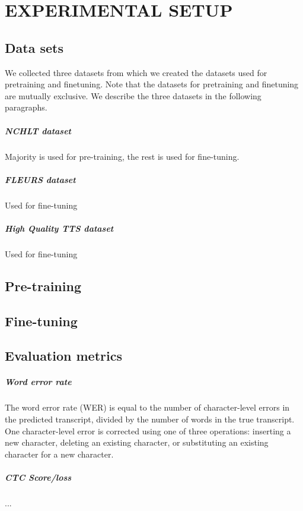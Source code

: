 \chapter{EXPERIMENTAL SETUP}

\section{Data sets}

We collected three datasets from which we created the datasets used for pretraining and finetuning. 
Note that the datasets for pretraining and finetuning are mutually exclusive. 
We describe the three datasets in the following paragraphs.

\paragraph*{NCHLT dataset} Majority is used for pre-training, the rest is used for fine-tuning.

\paragraph*{FLEURS dataset} Used for fine-tuning

\paragraph*{High Quality TTS dataset} Used for fine-tuning



\section{Pre-training}

\section{Fine-tuning}

\section{Evaluation metrics}

\paragraph*{Word error rate}
The word error rate (WER) is equal to the number of character-level errors in the predicted transcript, 
divided by the number of words in the true transcript. One character-level error is corrected using one of three operations:
inserting a new character, deleting an existing character, or substituting an existing character for a new character.

\paragraph*{CTC Score/loss} ...